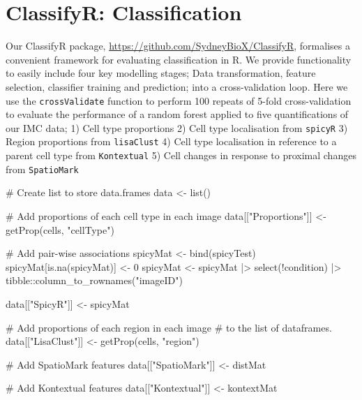 \documentclass[
  letterpaper,
  DIV=11,
  numbers=noendperiod]{scrreprt}
\newenvironment{Shaded}{\begin{snugshade}}{\end{snugshade}}
\newcommand{\CommentTok}[1]{\textcolor[rgb]{0.37,0.37,0.37}{#1}}
\newcommand{\DecValTok}[1]{\textcolor[rgb]{0.68,0.00,0.00}{#1}}
\newcommand{\FunctionTok}[1]{\textcolor[rgb]{0.28,0.35,0.67}{#1}}
\newcommand{\NormalTok}[1]{\textcolor[rgb]{0.00,0.23,0.31}{#1}}
\newcommand{\OtherTok}[1]{\textcolor[rgb]{0.00,0.23,0.31}{#1}}
\newcommand{\SpecialCharTok}[1]{\textcolor[rgb]{0.37,0.37,0.37}{#1}}
\newcommand{\StringTok}[1]{\textcolor[rgb]{0.13,0.47,0.30}{#1}}
\begin{document}
\section{ClassifyR: Classification}\label{classifyr-classification}

Our ClassifyR package, \url{https://github.com/SydneyBioX/ClassifyR},
formalises a convenient framework for evaluating classification in R. We
provide functionality to easily include four key modelling stages; Data
transformation, feature selection, classifier training and prediction;
into a cross-validation loop. Here we use the \texttt{crossValidate}
function to perform 100 repeats of 5-fold cross-validation to evaluate
the performance of a random forest applied to five quantifications of
our IMC data; 1) Cell type proportions 2) Cell type localisation from
\texttt{spicyR} 3) Region proportions from \texttt{lisaClust} 4) Cell
type localisation in reference to a parent cell type from
\texttt{Kontextual} 5) Cell changes in response to proximal changes from
\texttt{SpatioMark}

\begin{Shaded}
\begin{Highlighting}[]
\CommentTok{\# Create list to store data.frames}
\NormalTok{data }\OtherTok{\textless{}{-}} \FunctionTok{list}\NormalTok{()}

\CommentTok{\# Add proportions of each cell type in each image}
\NormalTok{data[[}\StringTok{"Proportions"}\NormalTok{]] }\OtherTok{\textless{}{-}} \FunctionTok{getProp}\NormalTok{(cells, }\StringTok{"cellType"}\NormalTok{)}

\CommentTok{\# Add pair{-}wise associations}
\NormalTok{spicyMat }\OtherTok{\textless{}{-}} \FunctionTok{bind}\NormalTok{(spicyTest)}
\NormalTok{spicyMat[}\FunctionTok{is.na}\NormalTok{(spicyMat)] }\OtherTok{\textless{}{-}} \DecValTok{0}
\NormalTok{spicyMat }\OtherTok{\textless{}{-}}\NormalTok{ spicyMat }\SpecialCharTok{|\textgreater{}}
  \FunctionTok{select}\NormalTok{(}\SpecialCharTok{!}\NormalTok{condition) }\SpecialCharTok{|\textgreater{}}
\NormalTok{  tibble}\SpecialCharTok{::}\FunctionTok{column\_to\_rownames}\NormalTok{(}\StringTok{"imageID"}\NormalTok{)}

\NormalTok{data[[}\StringTok{"SpicyR"}\NormalTok{]] }\OtherTok{\textless{}{-}}\NormalTok{ spicyMat}

\CommentTok{\# Add proportions of each region in each image}
\CommentTok{\# to the list of dataframes.}
\NormalTok{data[[}\StringTok{"LisaClust"}\NormalTok{]] }\OtherTok{\textless{}{-}} \FunctionTok{getProp}\NormalTok{(cells, }\StringTok{"region"}\NormalTok{)}


\CommentTok{\# Add SpatioMark features}
\NormalTok{data[[}\StringTok{"SpatioMark"}\NormalTok{]] }\OtherTok{\textless{}{-}}\NormalTok{ distMat}

\CommentTok{\# Add Kontextual features}
\NormalTok{data[[}\StringTok{"Kontextual"}\NormalTok{]] }\OtherTok{\textless{}{-}}\NormalTok{ kontextMat}
\end{Highlighting}
\end{Shaded}
\end{document}

